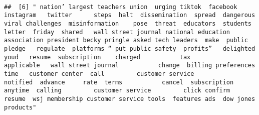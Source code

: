 \documentclass[
]{article}
\begin{document}
\begin{verbatim}
                                                                                                                                                                                                                                                                                                                                                                                                                                                                   
##  [6] " nation’ largest teachers union  urging tiktok  facebook   instagram   twitter      steps  halt  dissemination  spread  dangerous viral challenges  misinformation    pose  threat  educators  students   letter  friday  shared   wall street journal national education association president becky pringle asked tech leaders  make  public pledge   regulate  platforms “ put public safety  profits”   delighted  youd   resume  subscription    charged           tax          applicable   wall street journal           change  billing preferences   time   customer center  call         customer service            notified  advance     rate  terms           cancel  subscription  anytime  calling         customer service         click confirm  resume  wsj membership customer service tools  features ads  dow jones products"                                                                                                                                                                                                                                                                                                                                                                                                                                                                                                                                                                                                                                                                                                                                                                                                                                                                                                                                                                                                                                                                                                                                                                                                                                                                                                                                                                                                                                                                                                                                                                                                                                                                                                                                                                                                                                                                                                                                                                                                                                                                                                                        
\end{verbatim}
\end{document}
